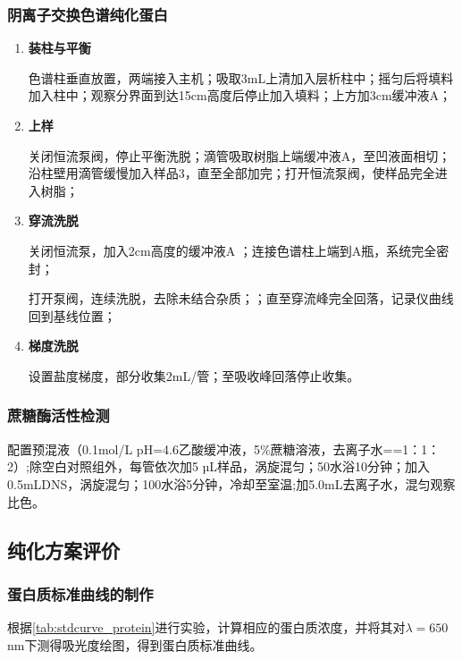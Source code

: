 \subsubsection{阴离子交换色谱纯化蛋白}

\begin{enumerate}
\item \textbf{装柱与平衡}
\par 色谱柱垂直放置，两端接入主机；吸取3mL上清加入层析柱中；摇匀后将填料加入柱中；观察分界面到达15cm高度后停止加入填料；上方加3cm缓冲液A；
\item  \textbf{上样}
   \par 关闭恒流泵阀，停止平衡洗脱；滴管吸取树脂上端缓冲液A，至凹液面相切；沿柱壁用滴管缓慢加入样品3，直至全部加完；打开恒流泵阀，使样品完全进入树脂；
\item \textbf{穿流洗脱}
    \par 关闭恒流泵，加入2cm高度的缓冲液A ；连接色谱柱上端到A瓶，系统完全密封；
    \par 打开泵阀，连续洗脱，去除未结合杂质；；直至穿流峰完全回落，记录仪曲线回到基线位置；
\item \textbf{梯度洗脱}
 \par 设置盐度梯度，部分收集2mL/管；至吸收峰回落停止收集。
\end{enumerate}

\subsubsection{蔗糖酶活性检测}

配置预混液（0.1mol/L pH=4.6乙酸缓冲液，5\%蔗糖溶液，去离子水==1：1：2）;除空白对照组外，每管依次加5 µL样品，涡旋混匀；50\dc 水浴10分钟；加入0.5mLDNS，涡旋混匀；100\dc 水浴5分钟，冷却至室温;加5.0mL去离子水，混匀观察比色。

\subsection{纯化方案评价}
\subsubsection{蛋白质标准曲线的制作}
根据\autoref{tab:stdcurve_protein}进行实验，计算相应的蛋白质浓度，并将其对$\lambda = 650$nm下测得吸光度绘图，得到蛋白质标准曲线。

